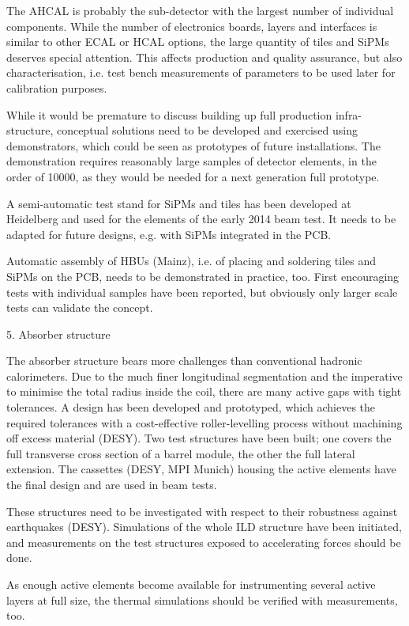 The AHCAL is probably the sub-detector with the largest number of individual components. While the number of electronics boards, layers and interfaces is similar to other ECAL or HCAL options, the large quantity of tiles and SiPMs deserves special attention. This affects production and quality assurance, but also characterisation, i.e. test bench measurements of parameters to be used later for calibration purposes.  

While it would be premature to discuss building up full production infra-structure, conceptual solutions need to be developed and exercised using demonstrators, which could be seen as prototypes of future installations. The demonstration requires reasonably large samples of detector elements, in the order of 10000, as they would be needed for a next generation full prototype. 

A semi-automatic test stand for SiPMs and tiles has been developed at Heidelberg and used for the elements of the early 2014 beam test. It needs to be adapted for future designs, e.g. with SiPMs integrated in the PCB. 

Automatic assembly of HBUs (Mainz), i.e. of placing and soldering tiles and SiPMs on the PCB, needs to be demonstrated in practice, too. First encouraging tests with individual samples have been reported, but obviously only larger scale tests can validate the concept. 

5.  Absorber structure

The absorber structure bears more challenges than conventional hadronic calorimeters. Due to the much finer longitudinal segmentation and the imperative to minimise the total radius inside the coil, there are many active gaps with tight tolerances. A design has been developed and prototyped, which achieves the required tolerances with a cost-effective roller-levelling process without machining off excess material (DESY). Two test structures have been built; one covers the full transverse cross section of a barrel module, the other the full lateral extension. The cassettes (DESY, MPI Munich) housing the active elements have the final design and are used in beam tests. 

These structures need to be investigated with respect to their robustness against earthquakes (DESY). Simulations of the whole ILD structure have been initiated, and measurements on the test structures exposed to accelerating forces should be done. 

As enough active elements become available for instrumenting several active layers at full size, the thermal simulations should be verified with measurements, too. 

